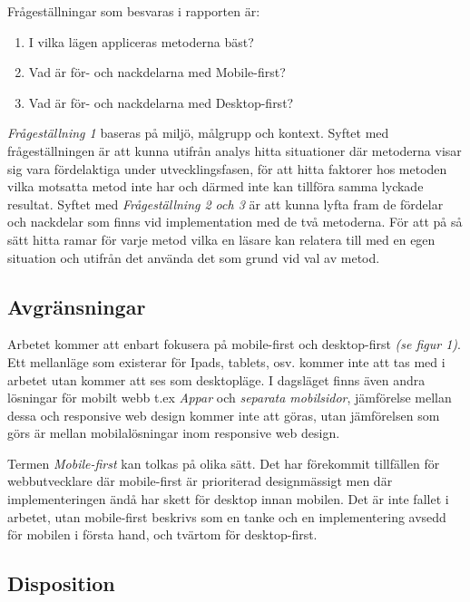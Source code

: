 \documentclass[11pt]{article}
\begin{document}
\vspace{0.5cm}
Frågeställningar som besvaras i rapporten är:
\begin{enumerate}
	\item I vilka lägen appliceras metoderna bäst?
	\item Vad är för- och nackdelarna med Mobile-first?
	\item Vad är för- och nackdelarna med Desktop-first?
\end{enumerate}
\vspace{0.5cm}
\textit{Frågeställning 1} baseras på miljö, målgrupp och kontext. Syftet med frågeställningen är att kunna utifrån analys hitta situationer där metoderna visar sig vara fördelaktiga under utvecklingsfasen, för att hitta faktorer hos metoden vilka motsatta metod inte har och därmed inte kan tillföra samma lyckade resultat. Syftet med \textit{Frågeställning 2 och 3} är att kunna lyfta fram de fördelar och nackdelar som finns vid implementation med de två metoderna. För att på så sätt hitta ramar för varje metod vilka en läsare kan relatera till med en egen situation och utifrån det använda det som grund vid val av metod. 

\subsection{Avgränsningar}

Arbetet kommer att enbart fokusera på mobile-first och desktop-first \textit{(se figur 1)}. Ett mellanläge som existerar för Ipads, tablets, osv. kommer inte att tas med i arbetet utan kommer att ses som desktopläge. I dagsläget finns även andra lösningar för mobilt webb t.ex \textit{Appar} och \textit{separata mobilsidor}, jämförelse mellan dessa och responsive web design kommer inte att göras, utan jämförelsen som görs är mellan mobilalösningar inom responsive web design.

Termen \textit{Mobile-first} kan tolkas på olika sätt. Det har förekommit tillfällen för webbutvecklare där mobile-first är prioriterad designmässigt men där implementeringen ändå har skett för desktop innan mobilen. Det är inte fallet i arbetet, utan mobile-first beskrivs som en tanke och en implementering avsedd för mobilen i första hand, och tvärtom för desktop-first.

\subsection{Disposition}
\end{document}

